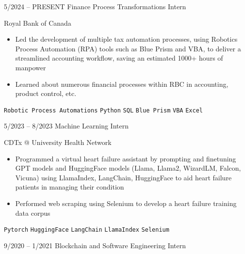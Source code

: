 \documentclass[9pt]{developercv} %
\begin{document}
\vspace{-10 pt}
\begin{entrylist}
    \entry
        {5/2024 -- PRESENT}
		{Finance Process Transformations Intern}
		{}
		{\vspace{-10pt}
  
       Royal Bank of Canada
        \vspace{5pt}
        \begin{itemize}[noitemsep,topsep=0pt,parsep=0pt,partopsep=0pt, leftmargin=-1pt]
            \item Led the development of multiple tax automation processes, using Robotics Process Automation (RPA) tools such as Blue Prism and VBA, to deliver a streamlined accounting workflow,  saving an estimated 1000+ hours of manpower
            \item Learned about numerous financial processes within RBC in accounting, product control, etc.
        \end{itemize} 
        \vspace{5pt}
        \texttt{Robotic Process Automations} \slashsep \texttt{Python} \slashsep \texttt{SQL} \slashsep \texttt{Blue Prism} \slashsep \texttt{VBA} \slashsep \texttt{Excel}}
	\entry
        {5/2023 -- 8/2023}
		{Machine Learning Intern}
		{}
		{\vspace{-10pt}
  
        CDTx @ University Health Network
        \vspace{5pt}
        \begin{itemize}[noitemsep,topsep=0pt,parsep=0pt,partopsep=0pt, leftmargin=-1pt]
            \item Programmed a virtual heart failure assistant by prompting and finetuning GPT models and HuggingFace models (Llama, Llama2, WizardLM, Falcon, Vicuna) using LlamaIndex, LangChain, HuggingFace to aid heart failure patients in managing their condition
            \item Performed web scraping using Selenium to develop a heart failure training data corpus
        \end{itemize} 
        \vspace{5pt}
        \texttt{Pytorch} \slashsep \texttt{HuggingFace} \slashsep \texttt{LangChain} \slashsep \texttt{LlamaIndex} \slashsep \texttt{Selenium}}
        \entry
		{9/2020 -- 1/2021}
		{Blockchain and Software Engineering Intern}
		{}
		{\vspace{-10pt}
  
}
\end{entrylist}
\end{document}
